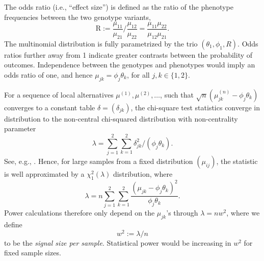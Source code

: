The odds ratio (i.e., ``effect size'') is defined as the ratio of the phenotype frequencies between the two genotype variants,
\begin{equation} \label{eq:odds-ratio}
    \text{R} := \frac{\mu_{11}}{\mu_{21}}\Big/\frac{\mu_{12}}{\mu_{22}}
    = \frac{\mu_{11}\mu_{22}}{\mu_{12}\mu_{21}}.
\end{equation}
The multinomial distribution is fully parametrized by the trio $(\theta_1, \phi_1, R)$.
Odds ratios further away from 1 indicate greater contrasts between the probability of outcomes.
Independence between the genotypes and phenotypes would imply an odds ratio of one, and hence $\mu_{jk} = \phi_j\theta_k$, for all $j,k \in\{1,2\}$.

For a sequence of local alternatives $\mu^{(1)}, \mu^{(2)}, \ldots$, such that $\sqrt{n}(\mu^{(n)}_{jk} - \phi_j\theta_k)$ converges to a constant table $\delta = (\delta_{jk})$, the chi-square test statistics converge in distribution to the non-central chi-squared distribution with non-centrality parameter 
\begin{equation*}
    \lambda = \sum_{j=1}^2 \sum_{k=1}^2 {\delta_{jk}^2}/{(\phi_j\theta_k)}.
\end{equation*}
See, e.g., \cite{ferguson2017course}.
Hence, for large samples from a fixed distribution $(\mu_{ij})$, the statistic is well approximated by a $\chi^2_1(\lambda)$ distribution, where
\begin{equation} 
\lambda = n\sum_{j=1}^2 \sum_{k=1}^2 \frac{(\mu_{jk} - \phi_j\theta_k)^2}{\phi_j\theta_k}.
\end{equation}
Power calculations therefore only depend on the $\mu_{jk}$'s through $\lambda=nw^2$, where we define 
\begin{equation} \label{eq:signal-size-chisq}
    w^2:=\lambda/n
\end{equation} 
to be the \emph{signal size per sample}. 
Statistical power would be increasing in $w^2$ for fixed sample sizes.

